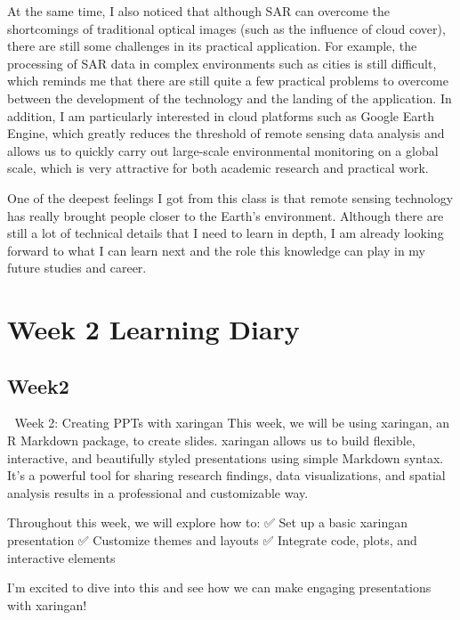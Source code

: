 \documentclass[
  letterpaper,
  DIV=11,
  numbers=noendperiod]{scrreprt}
\begin{document}
At the same time, I also noticed that although SAR can overcome the
shortcomings of traditional optical images (such as the influence of
cloud cover), there are still some challenges in its practical
application. For example, the processing of SAR data in complex
environments such as cities is still difficult, which reminds me that
there are still quite a few practical problems to overcome between the
development of the technology and the landing of the application. In
addition, I am particularly interested in cloud platforms such as Google
Earth Engine, which greatly reduces the threshold of remote sensing data
analysis and allows us to quickly carry out large-scale environmental
monitoring on a global scale, which is very attractive for both academic
research and practical work.

One of the deepest feelings I got from this class is that remote sensing
technology has really brought people closer to the Earth's environment.
Although there are still a lot of technical details that I need to learn
in depth, I am already looking forward to what I can learn next and the
role this knowledge can play in my future studies and career.


\chapter{Week 2 Learning Diary}\label{week-2-learning-diary}

\section{Week2}\label{week2}

📢 Week 2: Creating PPTs with xaringan This week, we will be using
xaringan, an R Markdown package, to create slides. xaringan allows us to
build flexible, interactive, and beautifully styled presentations using
simple Markdown syntax. It's a powerful tool for sharing research
findings, data visualizations, and spatial analysis results in a
professional and customizable way.

Throughout this week, we will explore how to: ✅ Set up a basic xaringan
presentation ✅ Customize themes and layouts ✅ Integrate code, plots,
and interactive elements

I'm excited to dive into this and see how we can make engaging
presentations with xaringan! 🚀

\end{document}
